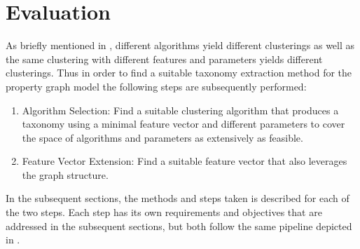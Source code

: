  \chapter{Evaluation}\label{\positionnumber}
 As briefly mentioned in , different algorithms yield different clusterings as well as the same clustering with different features and parameters yields different clusterings. Thus in order to find a suitable taxonomy extraction method for the property graph model the following steps are subsequently performed:
\begin{enumerate}
    \item Algorithm Selection: Find a suitable clustering algorithm that produces a taxonomy using a minimal feature vector and different parameters to cover the space of algorithms and parameters as extensively as feasible.
    \item Feature Vector Extension: Find a suitable feature vector that also leverages the graph structure.
\end{enumerate}
In the subsequent sections, the methods and steps taken is described for each of the two steps.
 Each step has its own requirements and objectives that are addressed in the subsequent sections, but both follow the same pipeline depicted in . \\


